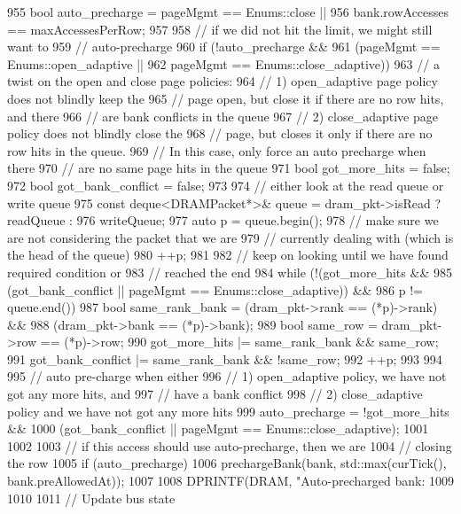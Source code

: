 \begin{DoxyCode}
{955     bool auto_precharge = pageMgmt == Enums::close ||
956         bank.rowAccesses == maxAccessesPerRow;
957 
958     // if we did not hit the limit, we might still want to
959     // auto-precharge
960     if (!auto_precharge &&
961         (pageMgmt == Enums::open_adaptive ||
962          pageMgmt == Enums::close_adaptive)) {
963         // a twist on the open and close page policies:
964         // 1) open_adaptive page policy does not blindly keep the
965         // page open, but close it if there are no row hits, and there
966         // are bank conflicts in the queue
967         // 2) close_adaptive page policy does not blindly close the
968         // page, but closes it only if there are no row hits in the queue.
969         // In this case, only force an auto precharge when there
970         // are no same page hits in the queue
971         bool got_more_hits = false;
972         bool got_bank_conflict = false;
973 
974         // either look at the read queue or write queue
975         const deque<DRAMPacket*>& queue = dram_pkt->isRead ? readQueue :
976             writeQueue;
977         auto p = queue.begin();
978         // make sure we are not considering the packet that we are
979         // currently dealing with (which is the head of the queue)
980         ++p;
981 
982         // keep on looking until we have found required condition or
983         // reached the end
984         while (!(got_more_hits &&
985                  (got_bank_conflict || pageMgmt == Enums::close_adaptive)) &&
986                p != queue.end()) {
987             bool same_rank_bank = (dram_pkt->rank == (*p)->rank) &&
988                 (dram_pkt->bank == (*p)->bank);
989             bool same_row = dram_pkt->row == (*p)->row;
990             got_more_hits |= same_rank_bank && same_row;
991             got_bank_conflict |= same_rank_bank && !same_row;
992             ++p;
993         }
994 
995         // auto pre-charge when either
996         // 1) open_adaptive policy, we have not got any more hits, and
997         //    have a bank conflict
998         // 2) close_adaptive policy and we have not got any more hits
999         auto_precharge = !got_more_hits &&
1000             (got_bank_conflict || pageMgmt == Enums::close_adaptive);
1001     }
1002 
1003     // if this access should use auto-precharge, then we are
1004     // closing the row
1005     if (auto_precharge) {
1006         prechargeBank(bank, std::max(curTick(), bank.preAllowedAt));
1007 
1008         DPRINTF(DRAM, "Auto-precharged bank: %
1009     }
1010 
1011     // Update bus state
}
\end{DoxyCode}
